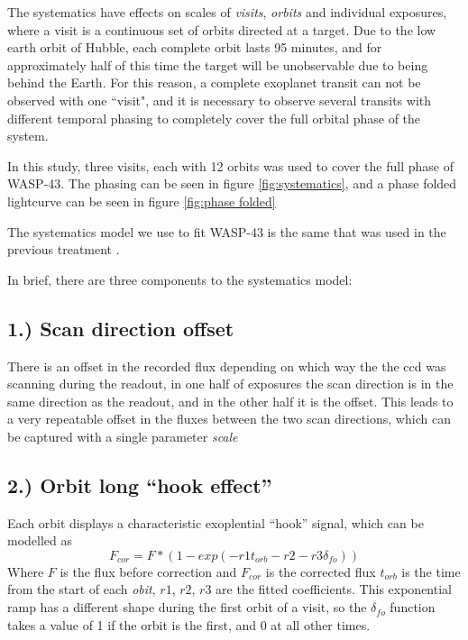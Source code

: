 \documentclass[a4paper,fleqn,usenatbib]{mnras}
\begin{document}
The systematics have effects on scales of \emph{visits}, \emph{orbits} and individual exposures, where a visit is a continuous set of orbits directed at a target. Due to the low earth orbit of Hubble, each complete orbit lasts 95 minutes, and for approximately half of this time the target will be unobservable due to being behind the Earth. For this reason, a complete exoplanet transit can not be observed with one ``visit", and it is necessary to observe several transits with different temporal phasing to completely cover the full orbital phase of the system.

In this study, three visits, each with 12 orbits was used to cover the full phase of WASP-43. The phasing can be seen in figure \ref{fig:systematics}, and a phase folded lightcurve can be seen in figure \ref{fig:phase folded}

The systematics model we use to fit WASP-43 is the same that was used in the previous treatment \citep{Stevenson2014}.

In brief, there are three components to the systematics model:
\subsection*{1.) Scan direction offset}

There is an offset in the recorded flux depending on which way the the ccd was scanning during the readout, in one half of exposures the scan direction is in the same direction as the readout, and in the other half it is the offset. This leads to a very repeatable offset in the fluxes between the two scan directions, which can be captured with a single parameter \emph{scale}

\subsection*{2.) Orbit long ``hook effect''}

Each orbit displays a characteristic exoplential ``hook'' signal, which can be modelled as
\begin{equation} \label{eq:hook}
F_{cor} = F*(1-exp(-r1 t_{orb}-r2-r3 \delta_{fo}))
\end{equation}
Where $F$ is the flux before correction and $F_{cor}$ is the corrected flux $t_{orb}$ is the time from the start of each \emph{obit}, $r1$, $r2$, $r3$ are the fitted coefficients. This exponential ramp has a different shape during the first orbit of a visit, so the $\delta_{fo}$ function takes a value of 1 if the orbit is the first, and 0 at all other times.
\end{document}
